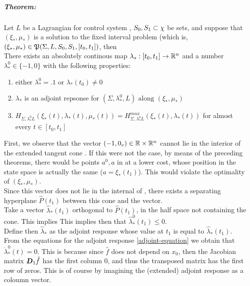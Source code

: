 \subparagraph[6.3]{Theorem:}Let $L$ be a Lagrangian for control system \controlSystem, $S_0,S_1\subset\chi$ be sets, and suppose that $(\xi_*,\mu_*)$ is a solution to the fixed interval problem (which is, $(\xi_*,\mu_*)\in\mathfrak{P}(\Sigma,L,S_0,S_1,[t_0,t_1])$, then\\
There exists an absolutely continous map $\lambda_*:[t_0,t_1]\rightarrow\mathbb{R}^n$ and a number $\lambda_*^0\in\{-1,0\}$ with the following properties:
\begin{enumerate}
	\item either $\lambda_*^0=.1$ or $\lambda_*(t_0)\ne0$
	\item $\lambda_*$ is an adjoint repsonse for $(\Sigma,\lambda_*^0,L)\text{ along }(\xi_*,\mu_*)$
	\item $H_{\Sigma,\lambda_*^0L}(\xi_*(t),\lambda_*(t),\mu_*(t))=H_{\Sigma,\lambda_*^0L}^{max}(\xi_*(t),\lambda_*(t))$ for almost every $t\in[t_0,t_1]$
\end{enumerate}
 First, we observe that the vector $(-1,0_v)\in\mathbb{R}\times\mathbb{R}^n$ cannot lie in the interior of the extended tangent cone . If this were not the case, by means of \label{REF REF REFERENCE TODO} the preceding theorems, there would be points $a^0,a$ in  at a lower cost, whose position in the state space is actually the same ($a=\xi_*(t_1)$). This would violate the optimality of $(\xi_*,\mu_*)$.\\
Since this vector does not lie in the internal of , there exists a separating hyperplane $\hat P(t_1)$ between this cone and the vector. \\
Take a vector $\hat{\lambda}_*(t_1)$ orthogonal to $\hat P(t_1)$, in the half space not containing the cone. This implies 
This implies then that $\hat{\lambda}_*^0(t_1)\leq0$.\\
Define then $\hat{\lambda}_*$ as the adjoint response whose value at $t_1$ is equal to $\hat{\lambda}_*(t_1)$.\\
From the equations for the adjoint response \ref{adjoint-equation} we obtain that $\dot{\lambda}_*^0(t)=0$. This is because since $\hat f$ does not depend on $x_0$, then the Jacobian matrix $\boldsymbol{D}_{1}\hat f$ has the first column $0$, and thus the transposed matrix has the first row of zeros. This is of course by imagining the (extended) adjoint response as a coloumn vector.\\
